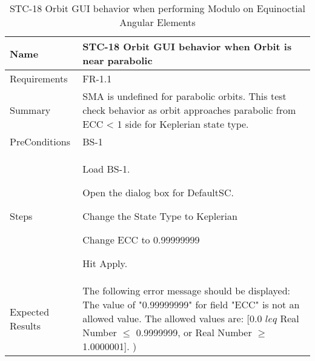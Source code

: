\clearpage

\begin{table}[htbp!]
\centering
      \begin{tabular}{|p{1.05 in} |p{4.75 in} |}
      \hline
         \rowcolor[rgb]{0.8,0.8,0.8} Name & STC-18 Orbit GUI behavior when Orbit is near parabolic\\
         \hline
         Requirements & FR-1.1\\  \hline
         Summary &
         SMA is undefined for parabolic orbits.  This test check behavior as orbit approaches parabolic
         from ECC < 1 side for Keplerian state type.
         \\     \hline
         PreConditions & BS-1\\     \hline
         Steps &
         \begin{compactenum}
             \item Load BS-1.
             \item Open the dialog box for DefaultSC.
             \item Change the State Type to Keplerian
             \item Change ECC to 0.99999999
             \item Hit Apply.
         \end{compactenum}
         \\ \hline
         Expected Results & The following error message should be displayed:
         The value of "0.99999999" for field "ECC" is not an allowed value.
         The allowed values are: [0.0 $leq$ Real Number $\leq$ 0.9999999, or Real Number $\geq$ 1.0000001].
         )\\
      \hline
      \end{tabular}
      \label{Table:STC-18}
      \caption{STC-18 Orbit GUI behavior when performing Modulo on Equinoctial Angular Elements}
\end{table}
\
